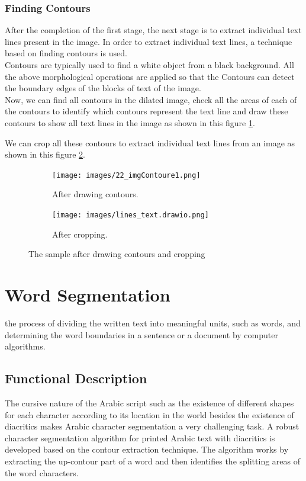 \subsubsection{Finding Contours}

After the completion of the first stage, the next stage is to extract individual text lines present in the image. In order to extract individual text lines, a technique based on finding contours is used.\\

Contours are typically used to find a white object from a black background. All the above morphological operations are applied so that the Contours can detect the boundary edges of the blocks of text of the image.\\

Now, we can find all contours in the dilated image, check all the areas of each of the contours to identify which contours represent the text line and draw these contours to show all text lines in the image as shown in this figure \ref{fig:drawing}.

We can crop all these contours to extract individual text lines from an image as shown in this figure \ref{fig:crop}.

\begin{figure}[!htb]
     \centering
     \begin{subfigure}[b]{0.4\textwidth}
        \centering
        \texttt{[image: images/22\_imgContoure1.png]}
        \caption{After drawing contours.} 
        \label{fig:drawing}
     \end{subfigure}
     \hfill
     \begin{subfigure}[b]{0.4\textwidth}
        \centering
        \texttt{[image: images/lines\_text.drawio.png]}
        \caption{After cropping.} 
        \label{fig:crop}
     \end{subfigure}
    \caption{The sample after drawing contours and cropping}
    \label{fig:drawing-contours-cropping}
\end{figure}


\section{Word Segmentation}
the process of dividing the written text into meaningful units, such as words, and determining the word boundaries in a sentence or a document by computer algorithms.

\subsection{Functional Description}
 The cursive nature of the Arabic script such as the existence of different shapes for each character according to its location in the world besides the existence of diacritics makes Arabic character segmentation a very challenging task. A robust character segmentation algorithm for printed Arabic text with diacritics is developed based on the contour extraction technique. The algorithm works by extracting the up-contour part of a word and then identifies the splitting areas of the word characters. 

